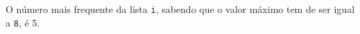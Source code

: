\documentclass[12pt,varwidth=16cm,border=1pt]{standalone}
\begin{document}
O número mais frequente da lista \verb+i+, sabendo que o valor máximo tem de ser igual a \verb+8+, é 5.

\questiomfalse
\end{document}
